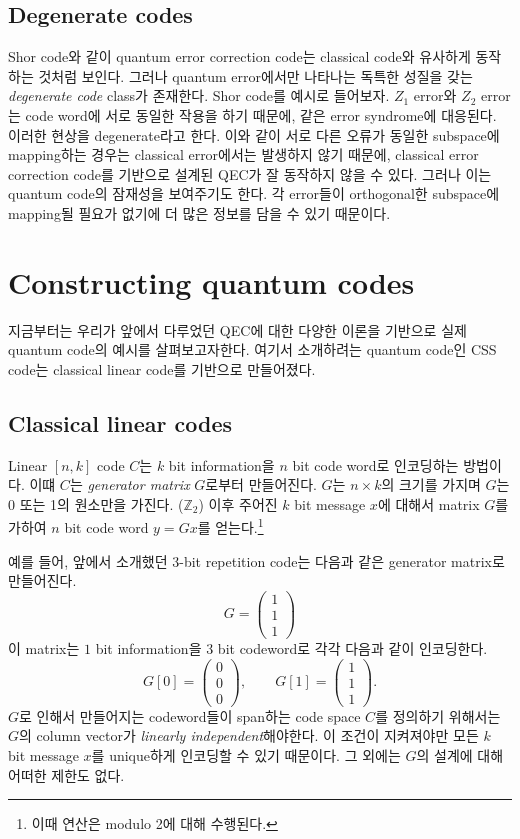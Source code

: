 \subsection{Degenerate codes}
Shor code와 같이 quantum error correction code는 classical code와 유사하게 동작하는 것처럼 보인다. 그러나 quantum error에서만 나타나는 독특한 성질을 갖는 \textit{degenerate code} class가 존재한다.
Shor code를 예시로 들어보자. $Z_1$ error와 $Z_2$ error는 code word에 서로 동일한 작용을 하기 때문에, 같은 error syndrome에 대응된다. 이러한 현상을 degenerate라고 한다. 이와 같이 서로 다른 오류가 동일한 subspace에 mapping하는 경우는 classical error에서는 발생하지 않기 때문에, classical error correction code를 기반으로 설계된 QEC가 잘 동작하지 않을 수 있다.
그러나 이는 quantum code의 잠재성을 보여주기도 한다. 각 error들이 orthogonal한 subspace에 mapping될 필요가 없기에 더 많은 정보를 담을 수 있기 때문이다.


\section{Constructing quantum codes}
지금부터는 우리가 앞에서 다루었던 QEC에 대한 다양한 이론을 기반으로 실제 quantum code의 예시를 살펴보고자한다. 여기서 소개하려는 quantum code인 CSS code는 classical linear code를 기반으로 만들어졌다.
\subsection{Classical linear codes}
Linear $[n, k]$ code $C$는 $k$ bit information을 $n$ bit code word로 인코딩하는 방법이다. 이떄 $C$는 \textit{generator matrix} $G$로부터 만들어진다. $G$는 $n\times k$의 크기를 가지며 $G$는 0 또는 1의 원소만을 가진다. ($\mathbb Z_2$) 이후 주어진 $k$ bit message $x$에 대해서 matrix $G$를 가하여 $n$ bit code word $y = Gx$를 얻는다.\footnote{이때 연산은 modulo 2에 대해 수행된다.}

예를 들어, 앞에서 소개했던 3-bit repetition code는 다음과 같은 generator matrix로 만들어진다.
\begin{equation*}
    G = \begin{pmatrix} 1 \\ 1 \\ 1 \end{pmatrix}
\end{equation*}
이 matrix는 $1$ bit information을 $3$ bit codeword로 각각 다음과 같이 인코딩한다.
\begin{equation*}
    G[0] = \begin{pmatrix} 0 \\ 0 \\ 0 \end{pmatrix}, \qquad G[1] = \begin{pmatrix} 1 \\ 1 \\ 1 \end{pmatrix}.
\end{equation*}
$G$로 인해서 만들어지는 codeword들이 span하는 code space $C$를 정의하기 위해서는 $G$의 column vector가 \textit{linearly independent}해야한다. 이 조건이 지켜져야만 모든 $k$ bit message $x$를 unique하게 인코딩할 수 있기 때문이다. 그 외에는 $G$의 설계에 대해 어떠한 제한도 없다.

